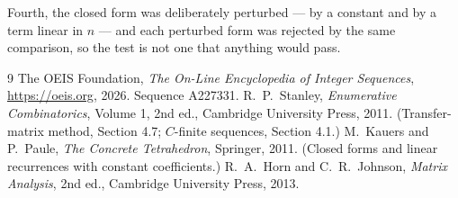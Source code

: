 \documentclass[11pt,a4paper]{article}
\theoremstyle{plain}
\theoremstyle{definition}
\begin{document}
Fourth, the closed form was deliberately perturbed --- by a constant and by a term linear in
$n$ --- and each perturbed form was rejected by the same comparison, so the test is not one
that anything would pass.

\begin{thebibliography}{9}
 The OEIS Foundation, \emph{The On-Line Encyclopedia of Integer
Sequences}, \url{https://oeis.org}, 2026. Sequence A227331.
 R.~P.~Stanley, \emph{Enumerative Combinatorics}, Volume 1, 2nd ed.,
Cambridge University Press, 2011. (Transfer-matrix method, Section 4.7; $C$-finite sequences,
Section 4.1.)
 M.~Kauers and P.~Paule, \emph{The Concrete Tetrahedron}, Springer, 2011.
(Closed forms and linear recurrences with constant coefficients.)
 R.~A.~Horn and C.~R.~Johnson, \emph{Matrix Analysis}, 2nd ed., Cambridge
University Press, 2013.
\end{thebibliography}
\end{document}
